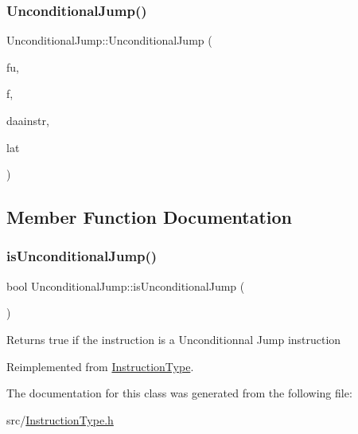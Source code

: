 \subsubsection{\texorpdfstring{Unconditional\+Jump()}{UnconditionalJump()}}
{\footnotesize\ttfamily Unconditional\+Jump\+::\+Unconditional\+Jump (\begin{DoxyParamCaption}\item[{const string \&}]{fu,  }\item[{const set$<$ \hyperlink{classInstructionFormat}{Instruction\+Format} $\ast$$>$ \&}]{f,  }\item[{\hyperlink{classDAAInstruction}{D\+A\+A\+Instruction} $\ast$}]{daainstr,  }\item[{int}]{lat }\end{DoxyParamCaption})}



\subsection{Member Function Documentation}
\mbox{\label{classUnconditionalJump_ab4588132d702a35f1dc1102dacba2be5}} 
\subsubsection{\texorpdfstring{is\+Unconditional\+Jump()}{isUnconditionalJump()}}
{\footnotesize\ttfamily bool Unconditional\+Jump\+::is\+Unconditional\+Jump (\begin{DoxyParamCaption}{ }\end{DoxyParamCaption})\hspace{0.3cm}{\ttfamily [virtual]}}

Returns true if the instruction is a Unconditionnal Jump instruction 

Reimplemented from \hyperlink{classInstructionType_a145a4e04a4db8a0ecf9e4b35b2403ed3}{Instruction\+Type}.



The documentation for this class was generated from the following file\+:\begin{DoxyCompactItemize}
\item 
src/\hyperlink{InstructionType_8h}{Instruction\+Type.\+h}\end{DoxyCompactItemize}
